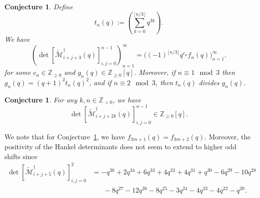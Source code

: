 \documentclass[11pt, leqno]{amsart}
\theoremstyle{plain}
\newtheorem{conjecture}[theorem]{Conjecture}
\theoremstyle{definition}
\numberwithin{equation}{section}
\newcommand{\seteq}{\mathbin{:=}}
\newcommand{\Mot}{\mathcal{M}} %
\newcommand{\Z}{\mathbb{Z}}
\begin{document}





\begin{conjecture}
\label{conj:factored_motzkin_2shifted}
Define
\[
t_n(q) \seteq \left( \sum_{k=0}^{\lfloor n/3 \rfloor} q^{3k} \right).
\]
We have
\[
\left( \det \left[ \widetilde{\Mot}^{\dagger}_{i+j+3}(q) \right]_{i,j=0}^{n-1} \right)_{n=1}^{\infty} = \bigl( (-1)^{\lfloor n/3 \rfloor} q^{c_n} f_n(q) \bigr)_{n=1}^{\infty}.
\]
for some $c_n \in \Z_{\geq 0}$ and $g_n(q) \in \Z_{\geq 0}[q]$. Moreover, if $n \equiv 1 \mod{3}$ then $g_n(q) = (q+1)^2 t_n(q)^2$, and if $n \equiv 2 \mod{3}$, then $t_n(q)$ divides $g_n(q)$.
\end{conjecture}

\begin{conjecture}
\label{conj:factored_motzkin_positive}
For any $k,n \in \Z_{>0}$, we have
\[
\det \left[ \widetilde{\Mot}^{\dagger}_{i+j+2k}(q) \right]_{i,j=0}^{n-1} \in \Z_{\geq 0}[q].
\]
\end{conjecture}

We note that for Conjecture~\ref{conj:factored_motzkin_2shifted}, we have $f_{3m+1}(q) = f_{3m+2}(q)$. Moreover, the positivity of the Hankel determinants does not seem to extend to higher odd shifts since
\begin{align*}
\det \left[ \widetilde{\Mot}^{\dagger}_{i+j+5}(q) \right]_{i,j=0}^{2} & = -q^{38} + 2q^{34} + 6q^{33} + 4q^{32} + 4q^{31} + q^{30} - 6q^{29} - 10q^{28}
\\ & \hspace{20pt} - 8q^{27} - 12q^{26} - 8q^{25} - 3q^{24} - 4q^{23} - 4q^{22} - q^{20}.
\end{align*}
\end{document}
